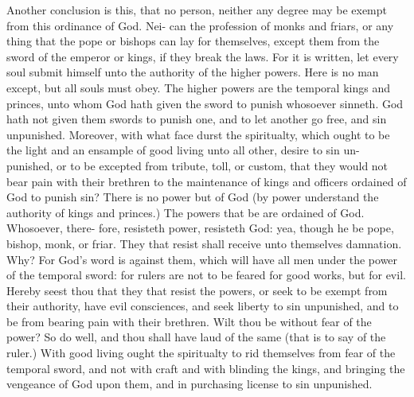 \documentclass{custom}
\begin{document}
Another conclusion is this, that no person, neither any 
degree may be exempt from this ordinance of God. Nei- 
can the profession of monks and friars, or any thing that 
the pope or bishops can lay for themselves, except them
from the sword of the emperor or kings, if they break 
the laws. For it is written, let every soul submit himself 
unto the authority of the higher powers. Here is no man 
except, but all souls must obey. The higher powers are 
the temporal kings and princes, unto whom God hath 
given the sword to punish whosoever sinneth. God hath 
not given them swords to punish one, and to let another 
go free, and sin unpunished. Moreover, with what face 
durst the spiritualty, which ought to be the light and an 
ensample of good living unto all other, desire to sin un- 
punished, or to be excepted from tribute, toll, or custom, 
that they would not bear pain with their brethren to 
the maintenance of kings and officers ordained of God to 
punish sin? There is no power but of God (by power 
understand the authority of kings and princes.) The 
powers that be are ordained of God. Whosoever, there- 
fore, resisteth power, resisteth God: yea, though he be 
pope, bishop, monk, or friar. They that resist shall 
receive unto themselves damnation. Why? For God's 
word is against them, which will have all men under the 
power of the temporal sword: for rulers are not to 
be feared for good works, but for evil. Hereby seest 
thou that they that resist the powers, or seek to be exempt 
from their authority, have evil consciences, and seek liberty 
to sin unpunished, and to be from bearing pain with 
their brethren. Wilt thou be without fear of the power?
So do well, and thou shall have laud of the same (that is 
to say of the ruler.) With good living ought the spiritualty 
to rid themselves from fear of the temporal sword, and 
not with craft and with blinding the kings, and bringing the 
vengeance of God upon them, and in purchasing license 
to sin unpunished. 
\end{document}
